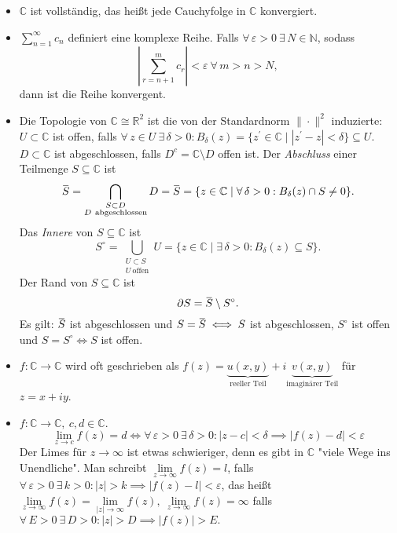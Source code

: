 \documentclass[a4paper,12pt]{article}
\renewcommand{\epsilon}{\varepsilon}
\theoremstyle{newthm}
\theoremstyle{newdef}
\theoremstyle{newrem}
\newcommand{\N}{\mathbb{N}}
\newcommand{\R}{\mathbb{R}}
\newcommand{\C}{\mathbb{C}}
\newcommand{\del}{\partial}
\newcommand{\overbar}[1]{\mkern 1.5mu\overline{\mkern-1.5mu#1\mkern-1.5mu}\mkern 1.5mu}
\begin{document}
		\begin{itemize}
			\item $\C$ ist vollständig, das heißt jede Cauchyfolge in $\C$ konvergiert.
			
			\item $ \sum_{n=1}^{\infty} c_n $ definiert eine komplexe Reihe. Falls $ \forall \, \epsilon > 0 \ \exists \, N \in \N $, sodass 
			$$ \left| \sum_{r=n+1}^{m} c_r \right| < \epsilon\ \forall\, m>n>N, $$
			dann ist die Reihe konvergent.
			
			\item Die Topologie von $ \C \cong \R^2 $ ist die von der Standardnorm $ \|\cdot\|^2 $ induzierte:\\
			$ U \subset \C $ ist offen, falls $ \forall\, z \in U \ \exists\, \delta > 0: B_\delta(z) = \{z^\prime \in \C \mid |z^\prime-z| < \delta \} \subseteq U $. $ D \subset \C $ ist abgeschlossen, falls $ D^c = \C \setminus D $ offen ist. Der \emph{Abschluss} einer Teilmenge $ S \subseteq \C $ ist 
			$$ \overbar{S} = \bigcap_{\substack{S \subset D\\D\ \text{abgeschlossen}}} D = \overbar{S} = \{ z \in \C \mid \forall\, \delta > 0: B_\delta(z) \cap S \neq 0 \}. $$
			Das \emph{Innere} von $ S \subseteq \C $ ist 
			$$ S^\circ = \bigcup_{\substack{U \subset S\\U\ \text{offen}}} U = \{ z \in \C\mid \exists\, \delta>0: B_\delta(z) \subseteq S \}. $$
			Der Rand von $ S \subseteq \C $ ist
			\[ \del S = \overbar{S}\setminus S^\circ. \]
			Es gilt: $ \overbar{S} $ ist abgeschlossen und $ S = \overbar{S} \iff S $ ist abgeschlossen, $ S^\circ $ ist offen und $ S = S^\circ \iff S $ ist offen.
			
			\item $ f: \C \to \C $ wird oft geschrieben als $ f(z) = \underbrace{u(x,y)}_{\text{reeller Teil}} + i\underbrace{v(x,y)}_{\text{imaginärer Teil}} $ für $ z = x+iy $.
			
			\item $ f: \C \to \C,\ c,d \in \C $. 
			$$ \lim_{z \to c} f(z) = d \iff \forall\, \epsilon > 0 \ \exists\, \delta >0: |z-c| < \delta \implies |f(z)-d|<\epsilon $$
			Der Limes für $ z \to \infty $ ist etwas schwieriger, denn es gibt in $\C$ "viele Wege ins Unendliche". Man schreibt $ \lim\limits_{z \to \infty} f(z) = l $, falls $ \forall \, \epsilon > 0 \ \exists\, k>0: |z|>k \implies |f(z)-l|<\epsilon $, das heißt $ \lim\limits_{z \to \infty} f(z) = \lim\limits_{|z| \to \infty} f(z),\ \lim\limits_{z \to \infty} f(z) = \infty $ falls $ \forall\, E>0 \ \exists\, D>0: |z|>D \implies |f(z)|>E. $
			

\end{itemize}
\end{document}

